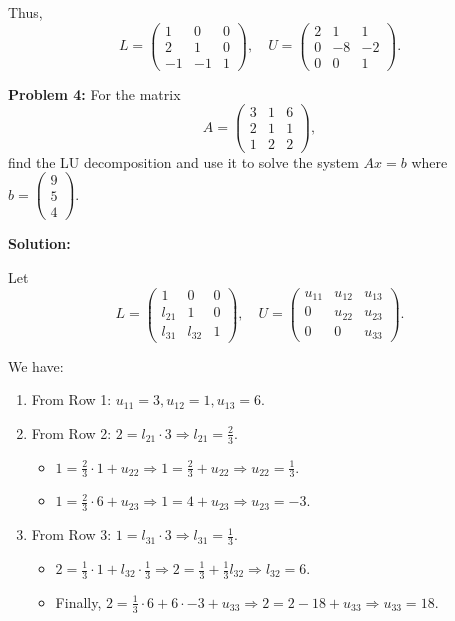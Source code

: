 \documentclass[
  letterpaper,
  DIV=11,
  numbers=noendperiod]{scrreprt}
\providecommand{\tightlist}{%
  \setlength{\itemsep}{0pt}\setlength{\parskip}{0pt}}\usepackage{longtable,booktabs,array}
\theoremstyle{plain}
\theoremstyle{definition}
\theoremstyle{remark}
\begin{document}
Thus,
\[ L = \begin{pmatrix} 1 & 0 & 0 \\ 2 & 1 & 0 \\ -1 & -1 & 1 \end{pmatrix}, \quad U = \begin{pmatrix} 2 & 1 & 1 \\ 0 & -8 & -2 \\ 0 & 0 & 1 \end{pmatrix}. \]

\textbf{Problem 4:} For the matrix
\[ A = \begin{pmatrix} 3 & 1 & 6 \\ 2 & 1 & 1 \\ 1 & 2 & 2 \end{pmatrix}, \]
find the LU decomposition and use it to solve the system \(Ax = b\)
where \(b = \begin{pmatrix} 9 \\ 5 \\ 4 \end{pmatrix}\).

\textbf{Solution:}

Let
\[ L = \begin{pmatrix} 1 & 0 & 0 \\ l_{21} & 1 & 0 \\ l_{31} & l_{32} & 1 \end{pmatrix}, \quad U = \begin{pmatrix} u_{11} & u_{12} & u_{13} \\ 0 & u_{22} & u_{23} \\ 0 & 0 & u_{33} \end{pmatrix}. \]

We have:

\begin{enumerate}
\def\labelenumi{\arabic{enumi}.}
\tightlist
\item
  From Row 1: \(u_{11} = 3, u_{12} = 1, u_{13} = 6\).
\item
  From Row 2: \(2 = l_{21} \cdot 3 \Rightarrow l_{21} = \frac{2}{3}\).

  \begin{itemize}
  \tightlist
  \item
    \(1 = \frac{2}{3} \cdot 1 + u_{22} \Rightarrow 1 = \frac{2}{3} + u_{22} \Rightarrow u_{22} = \frac{1}{3}\).
  \item
    \(1 = \frac{2}{3} \cdot 6 + u_{23} \Rightarrow 1 = 4 + u_{23} \Rightarrow u_{23} = -3\).
  \end{itemize}
\item
  From Row 3: \(1 = l_{31} \cdot 3 \Rightarrow l_{31} = \frac{1}{3}\).

  \begin{itemize}
  \tightlist
  \item
    \(2 = \frac{1}{3} \cdot 1 + l_{32} \cdot \frac{1}{3} \Rightarrow 2 = \frac{1}{3} + \frac{1}{3} l_{32} \Rightarrow l_{32} = 6\).
  \item
    Finally,
    \(2 = \frac{1}{3} \cdot 6 + 6 \cdot -3 + u_{33} \Rightarrow 2 = 2 - 18 + u_{33} \Rightarrow u_{33} = 18\).
  \end{itemize}
\end{enumerate}
\end{document}
